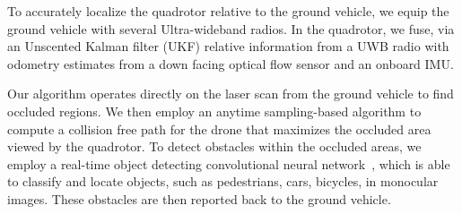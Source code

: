 To accurately localize the quadrotor relative to the ground vehicle, we equip the ground vehicle with several Ultra-wideband radios. In the quadrotor, we fuse, via an Unscented Kalman filter (UKF) relative information from a UWB radio with odometry estimates from a down facing optical flow sensor and an onboard IMU.

Our algorithm operates directly on the laser scan from the ground vehicle to find occluded
regions.
We then employ an anytime sampling-based algorithm to compute a collision free path for the drone
that maximizes the occluded area viewed by the quadrotor.
To detect obstacles within the occluded areas, we employ a real-time object detecting convolutional neural network~\cite{yolo}, which is able to classify and locate objects, such as pedestrians, cars, bicycles, in monocular images. These obstacles are then reported back to the ground vehicle.
